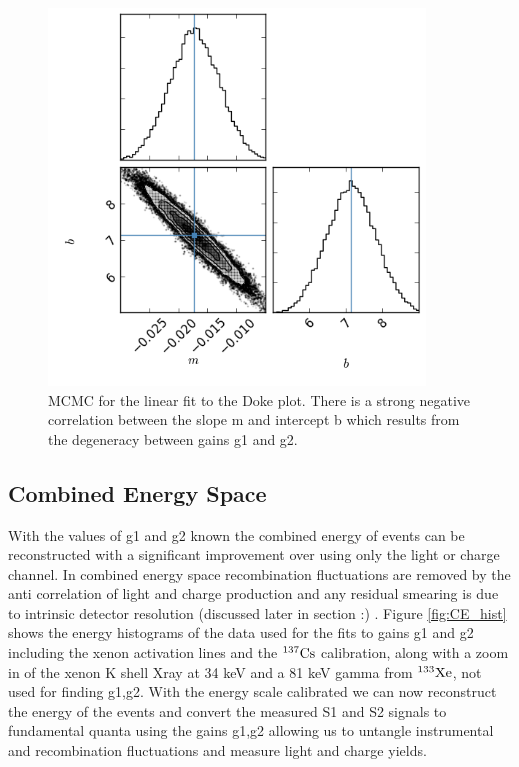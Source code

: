 \begin{figure}[h!]\centering
\includegraphics[width=100mm]{Recombination_LY_QY/Figures/MCMC/triangle.png} %
\caption{MCMC for the linear fit to the Doke plot. There is a strong negative correlation between the slope m and intercept b which results from the degeneracy between gains g1 and g2. }
\label{fig:MCMC} 
\end{figure}

\newpage

\subsection{Combined Energy Space}

With the values of g1 and g2 known the combined energy of events can be reconstructed with a significant improvement over using only the light or charge channel. In combined energy space recombination fluctuations are removed by the anti correlation of light and charge production and any residual smearing is due to intrinsic detector resolution (discussed later in section :) . Figure \ref{fig:CE_hist} shows the energy histograms of the data used for the fits to gains g1 and g2 including the xenon activation lines and the $\rm^{137}Cs$ calibration, along with a zoom in of the xenon K shell Xray at 34 keV and a 81 keV gamma from $\rm ^{133}Xe$, not used for finding g1,g2. With the energy scale calibrated we can now reconstruct the energy of the events and convert the measured S1 and S2 signals to fundamental quanta using  the gains g1,g2 allowing us to untangle instrumental and recombination fluctuations and measure light and charge yields.


